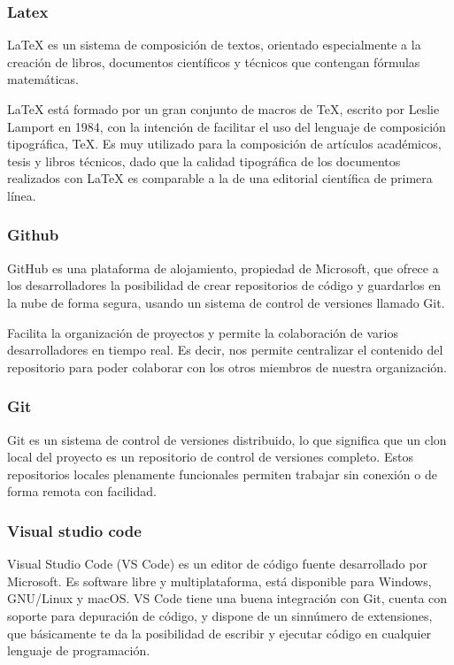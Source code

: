 \subsubsection{Latex}

LaTeX es un sistema de composición de textos, orientado especialmente a la creación de libros, documentos científicos y técnicos que contengan fórmulas matemáticas.

LaTeX está formado por un gran conjunto de macros de TeX, escrito por Leslie Lamport en 1984, con la intención de facilitar el uso del lenguaje de composición tipográfica, TeX. Es muy utilizado para la composición de artículos académicos, tesis y libros técnicos, dado que la calidad tipográfica de los documentos realizados con LaTeX es comparable a la de una editorial científica de primera línea.
\cite{Dlsi.ua.es}

\subsubsection{Github}

GitHub es una plataforma de alojamiento, propiedad de Microsoft, que ofrece a los desarrolladores la posibilidad de crear repositorios de código y guardarlos en la nube de forma segura, usando un sistema de control de versiones llamado Git.

Facilita la organización de proyectos y permite la colaboración de varios desarrolladores en tiempo real. Es decir, nos permite centralizar el contenido del repositorio para poder colaborar con los otros miembros de nuestra organización.
\cite{Platzi}

\subsubsection{Git}

Git es un sistema de control de versiones distribuido, lo que significa que un clon local del proyecto es un repositorio de control de versiones completo. Estos repositorios locales plenamente funcionales permiten trabajar sin conexión o de forma remota con facilidad.

\cite{Microsoft}

\subsubsection{Visual studio code}

Visual Studio Code (VS Code) es un editor de código fuente desarrollado por Microsoft. Es software libre y multiplataforma, está disponible para Windows, GNU/Linux y macOS. VS Code tiene una buena integración con Git, cuenta con soporte para depuración de código, y dispone de un sinnúmero de extensiones, que básicamente te da la posibilidad de escribir y ejecutar código en cualquier lenguaje de programación.\cite{OpenWebinars.net}

